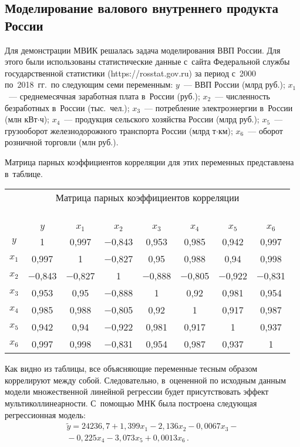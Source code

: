 \begin{multicols}{2}
\section{Моделирование валового внутреннего продукта России}

  Для демонстрации МВИК решалась задача моделирования ВВП России. Для 
этого были использованы статистические данные с~сайта Федеральной службы 
государственной статистики ({\sf https://rosstat.gov.ru}) за период с~2000 
по~2018~гг.\ по следующим семи переменным: $y$~--- ВВП России (млрд руб.); $x_1$~--- среднемесячная заработная плата 
в~России (руб.); $x_2$~--- численность безработных в~России (тыс.\ чел.); 
$x_3$~--- потребление электроэнергии в~России (млн кВт$\cdot$ч); $x_4$~--- 
продукция сельского хозяйства России (млрд руб.); $x_5$~--- грузооборот 
железнодорожного транспорта России (млрд т$\cdot$км); $x_6$~--- оборот 
розничной торговли (млн руб.).
  
  Матрица парных коэффициентов корреляции для этих переменных 
представлена в~таблице.
  
  \begin{table*}\small
  \begin{center}
  \begin{tabular}{|c|c|c|c|c|c|c|c|}
  \multicolumn{8}{c}{Матрица парных коэффициентов корреляции}\\
  \multicolumn{8}{c}{\ }\\[-6pt]
  \hline
&$y$&$x_1$&$x_2$&$x_3$&$x_4$&$x_5$&$x_6$\\
\hline
$y$&1&0,997&$-$0,843&0,953&0,985&0,942&0,997\\
$x_1$&0,997&1&$-$0,827&0,95\hphantom{9}&0,988&0,94\hphantom{9}&0,998\\
$x_2$&$-$0,843\hphantom{$-$}&$-$0,827\hphantom{$-$}&1&$-$0,888\hphantom{$-$}&$-$0,805\hphantom{$-$}
&$-$0,922\hphantom{$-$}&$-$0,831\hphantom{$-$}\\
$x_3$&0,953&0,95\hphantom{9}&$-$0,888&1&0,92\hphantom{9}&0,981&0,954\\
$x_4$&0,985&0,988&$-$0,805&0,92\hphantom{9}&1&0,917&0,987\\
$x_5$&0,942&0,94\hphantom{9}&$-$0,922&0,981&0,917&1&0,937\\
$x_6$&0,997&0,998&$-$0,831&0,954&0,987&0,937&1\\
\hline
\end{tabular}
\end{center}
\end{table*}
       
  
  Как видно из таблицы, все объясняющие переменные тесным образом 
коррелируют между собой. Следовательно, в~оцененной по исходным данным 
модели множественной линейной регрессии будет присутствовать эффект 
муль\-ти\-кол\-ли\-не\-ар\-ности. С~помощью МНК была построена следующая 
регрессионная модель:
  \begin{multline}
  \tilde{y}= 24236{,}7+1{,}399x_1-2{,}136x_2-0{,}0067x_3-{}\\
  {}- 0{,}225x_4-3{,}073x_5 +0{,}0013x_6\,.
  \label{e23-baz}
  \end{multline}
  

\end{multicols}
